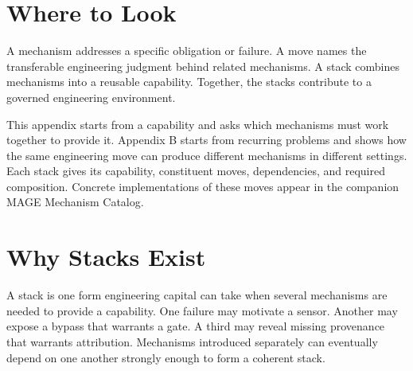 \section{Where to Look}\label{heading:where-to-look}

A mechanism addresses a specific obligation or failure. A move names the transferable engineering judgment behind related mechanisms. A stack combines mechanisms into a reusable capability. Together, the stacks contribute to a governed engineering environment.

This appendix starts from a capability and asks which mechanisms must work together to provide it. Appendix B starts from recurring problems and shows how the same engineering move can produce different mechanisms in different settings. Each stack gives its capability, constituent moves, dependencies, and required composition. Concrete implementations of these moves appear in the companion MAGE Mechanism Catalog.

\section{Why Stacks Exist}\label{heading:why-stacks-exist}

A stack is one form engineering capital can take when several mechanisms are needed to provide a capability. One failure may motivate a sensor. Another may expose a bypass that warrants a gate. A third may reveal missing provenance that warrants attribution. Mechanisms introduced separately can eventually depend on one another strongly enough to form a coherent stack.
